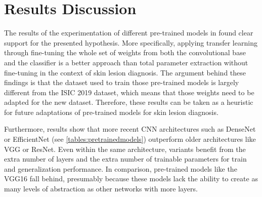\section{Results Discussion}
\label{section:optimization_discussion}
    The results of the experimentation of different pre-trained models in  found clear support for the presented hypothesis. More specifically, applying transfer learning through fine-tuning the whole set of weights from both the convolutional base and the classifier is a better approach than total parameter extraction without fine-tuning in the context of skin lesion diagnosis. The argument behind these findings is that the dataset used to train those pre-trained models is largely different from the \ac{ISIC} 2019 dataset, which means that those weights need to be adapted for the new dataset. Therefore, these results can be taken as a heuristic for future adaptations of pre-trained models for skin lesion diagnosis. \par
    
    Furthermore, results show that more recent \ac{CNN} architectures such as DenseNet or EfficientNet (see \autoref{tables:pretrainedmodels}) outperform older architectures like VGG or ResNet. Even within the same architecture, variants benefit from the extra number of layers and the extra number of trainable parameters for train and generalization performance. In comparison, pre-trained models like the VGG16 fall behind, presumably because these models lack the ability to create as many levels of abstraction as other networks with more layers. \par 
    
